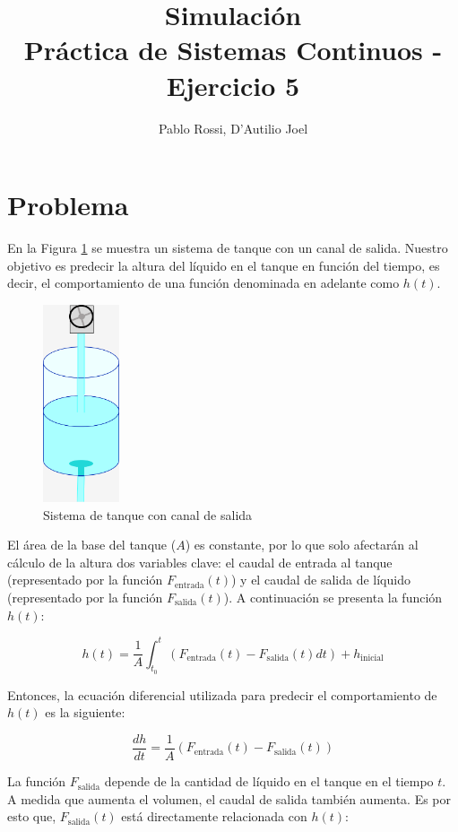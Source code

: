 \documentclass[12pt]{article}
\title{Simulación\\
	\large Práctica de Sistemas Continuos {-} Ejercicio 5}
\author{Pablo Rossi, D'Autilio Joel}
\date{}
\newcommand{\fent}{F_\text{entrada}}
\newcommand{\fsal}{F_\text{salida}}
\begin{document}
\maketitle

\section*{Problema}

En la Figura \ref{ima:tanque} se muestra un sistema de tanque con un canal de salida. Nuestro objetivo es predecir la altura del líquido en el tanque en función del tiempo, es decir, el comportamiento de una función denominada en adelante como $h(t)$.

\begin{figure}
	\centering
	\includegraphics[width=0.2\textwidth]{tanque}
	\caption{Sistema de tanque con canal de salida}
	\label{ima:tanque}
\end{figure}

El área de la base del tanque ($A$) es constante, por lo que solo afectarán al cálculo de la altura dos variables clave: el caudal de entrada al tanque (representado por la función $\fent(t)$) y el caudal de salida de líquido (representado por la función $\fsal(t)$). A continuación se presenta la función $h(t)$:

\[ h(t) = \frac{1}{A} \int_{t_0}^t (\fent(t) - \fsal(t) dt) + h_\text{inicial} \]

Entonces, la ecuación diferencial utilizada para predecir el comportamiento de $h(t)$ es la siguiente:

\[ \frac{dh}{dt} = \frac{1}{A} (\fent(t) - \fsal(t)) \]

La función $\fsal$ depende de la cantidad de líquido en el tanque en el tiempo $t$. A medida que aumenta el volumen, el caudal de salida también aumenta. Es por esto que,  $\fsal(t)$ está directamente relacionada con $h(t)$:
\end{document}

